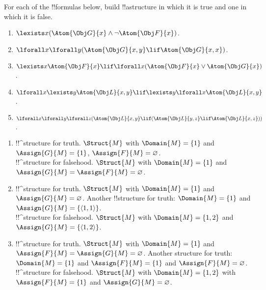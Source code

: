 \documentclass[../../../../include/open-logic-section]{subfiles}
\begin{document}
\begin{prob}
For each of the !!{formula}s below, build !!a{structure}
in which it is true and one in which it is false.
\begin{enumerate}
\item $\lexists x(\Atom{\Obj G}{x}\land\lnot \Atom{\Obj F}{x})$.
\item $\lforall x\lforall y(\Atom{\Obj G}{x,y}\lif \Atom{\Obj G}{x,x})$.
\item $\lexists x\Atom{\Obj F}{x}\lif\lforall x(\Atom{\Obj F}{x}\lor \Atom{\Obj G}{x})$.
\item $\lforall x\lexists y\Atom{\Obj L}{x,y}\lif\lexists y\lforall x\Atom{\Obj L}{x,y}$.
\item $\lforall x\lforall y\lforall z(\Atom{\Obj L}{x,y}\lif(\Atom{\Obj L}{y,z}\lif \Atom{\Obj L}{x,z}))$.
\end{enumerate}
\begin{ans}
\begin{enumerate}
	\item !!^{structure} for truth. $\Struct{M}$ with
	$\Domain{M}=\{1\}$ and $\Assign{G}{M}=\{1\}$,
	$\Assign{F}{M}=\varnothing$.\\
	!!^{structure} for falsehood. $\Struct{M}$ with $\Domain{M}=\{1\}$
	and $\Assign{G}{M}=\Assign{F}{M}=\varnothing$.

	\item !!^{structure} for truth. $\Struct{M}$ with
	$\Domain{M}=\{1\}$ and $\Assign{G}{M}=\varnothing$. Another
	!!{structure} for truth: $\Domain{M}=\{1\}$ and
	$\Assign{G}{M}=\{\langle 1,1\rangle\}$.\\
	!!^{structure} for falsehood. $\Struct{M}$ with
	$\Domain{M}=\{1,2\}$ and $\Assign{G}{M}=\{\langle 1,2\rangle\}$.

	\item !!^{structure} for truth. $\Struct{M}$ with
	$\Domain{M}=\{1\}$ and $\Assign{F}{M}=\Assign{G}{M}=\varnothing$.
	Another structure for truth: $\Domain{M}=\{1\}$ and
	$\Assign{F}{M}=\{1\}$ and $\Assign{F}{M}=\varnothing$.\\
	!!^{structure} for falsehood. $\Struct{M}$ with
	$\Domain{M}=\{1,2\}$ with $\Assign{F}{M}=\{1\}$ and
	$\Assign{G}{M}=\varnothing$. 


\end{enumerate}
\end{ans}
\end{prob}
\end{document}

